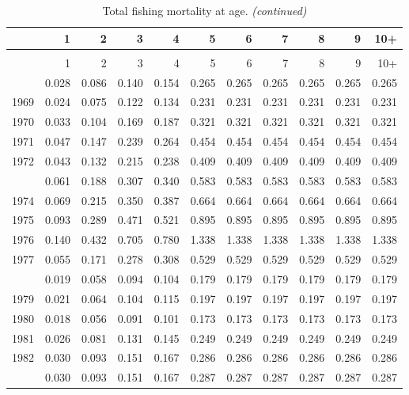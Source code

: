 \documentclass[
]{article}
\begin{document}
\begin{longtable}[t]{lrrrrrrrrrr}
\caption{\label{tab:FAA-tot-table}Total fishing mortality at age.}\\
\toprule
  & 1 & 2 & 3 & 4 & 5 & 6 & 7 & 8 & 9 & 10+\\
\midrule
\endfirsthead
\caption[]{Total fishing mortality at age. \textit{(continued)}}\\
\toprule
  & 1 & 2 & 3 & 4 & 5 & 6 & 7 & 8 & 9 & 10+\\
\midrule
\endhead

\endfoot
\bottomrule
\endlastfoot
1968 & 0.028 & 0.086 & 0.140 & 0.154 & 0.265 & 0.265 & 0.265 & 0.265 & 0.265 & 0.265\\
1969 & 0.024 & 0.075 & 0.122 & 0.134 & 0.231 & 0.231 & 0.231 & 0.231 & 0.231 & 0.231\\
1970 & 0.033 & 0.104 & 0.169 & 0.187 & 0.321 & 0.321 & 0.321 & 0.321 & 0.321 & 0.321\\
1971 & 0.047 & 0.147 & 0.239 & 0.264 & 0.454 & 0.454 & 0.454 & 0.454 & 0.454 & 0.454\\
1972 & 0.043 & 0.132 & 0.215 & 0.238 & 0.409 & 0.409 & 0.409 & 0.409 & 0.409 & 0.409\\
\addlinespace
1973 & 0.061 & 0.188 & 0.307 & 0.340 & 0.583 & 0.583 & 0.583 & 0.583 & 0.583 & 0.583\\
1974 & 0.069 & 0.215 & 0.350 & 0.387 & 0.664 & 0.664 & 0.664 & 0.664 & 0.664 & 0.664\\
1975 & 0.093 & 0.289 & 0.471 & 0.521 & 0.895 & 0.895 & 0.895 & 0.895 & 0.895 & 0.895\\
1976 & 0.140 & 0.432 & 0.705 & 0.780 & 1.338 & 1.338 & 1.338 & 1.338 & 1.338 & 1.338\\
1977 & 0.055 & 0.171 & 0.278 & 0.308 & 0.529 & 0.529 & 0.529 & 0.529 & 0.529 & 0.529\\
\addlinespace
1978 & 0.019 & 0.058 & 0.094 & 0.104 & 0.179 & 0.179 & 0.179 & 0.179 & 0.179 & 0.179\\
1979 & 0.021 & 0.064 & 0.104 & 0.115 & 0.197 & 0.197 & 0.197 & 0.197 & 0.197 & 0.197\\
1980 & 0.018 & 0.056 & 0.091 & 0.101 & 0.173 & 0.173 & 0.173 & 0.173 & 0.173 & 0.173\\
1981 & 0.026 & 0.081 & 0.131 & 0.145 & 0.249 & 0.249 & 0.249 & 0.249 & 0.249 & 0.249\\
1982 & 0.030 & 0.093 & 0.151 & 0.167 & 0.286 & 0.286 & 0.286 & 0.286 & 0.286 & 0.286\\
\addlinespace
1983 & 0.030 & 0.093 & 0.151 & 0.167 & 0.287 & 0.287 & 0.287 & 0.287 & 0.287 & 0.287\\

\end{longtable}
\end{document}
